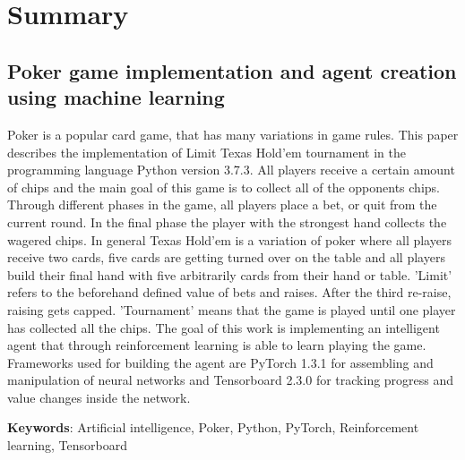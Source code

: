 \section*{Summary}
\subsection*{Poker game implementation and agent creation using machine learning}

Poker is a popular card game, that has many variations in game rules. This paper describes the implementation of Limit Texas Hold'em tournament in the programming language Python version 3.7.3. All players receive a certain amount of chips and the main goal of this game is to collect all of the opponents chips. Through different phases in the game, all players place a bet, or quit from the current round. In the final phase the player with the strongest hand collects the wagered chips. In general Texas Hold'em is a variation of poker where all players receive two cards, five cards are getting turned over on the table and all players build their final hand with five arbitrarily cards from their hand or table. 'Limit' refers to the beforehand defined value of bets and raises. After the third re-raise, raising gets capped. 'Tournament' means that the game is played until one player has collected all the chips. The goal of this work is implementing an intelligent agent that through reinforcement learning is able to learn playing the game. Frameworks used for building the agent are PyTorch 1.3.1 for assembling and manipulation of neural networks and Tensorboard 2.3.0 for tracking progress and value changes inside the network.

\noindent
\textbf{Keywords}: Artificial intelligence, Poker, Python, PyTorch, Reinforcement learning, Tensorboard
